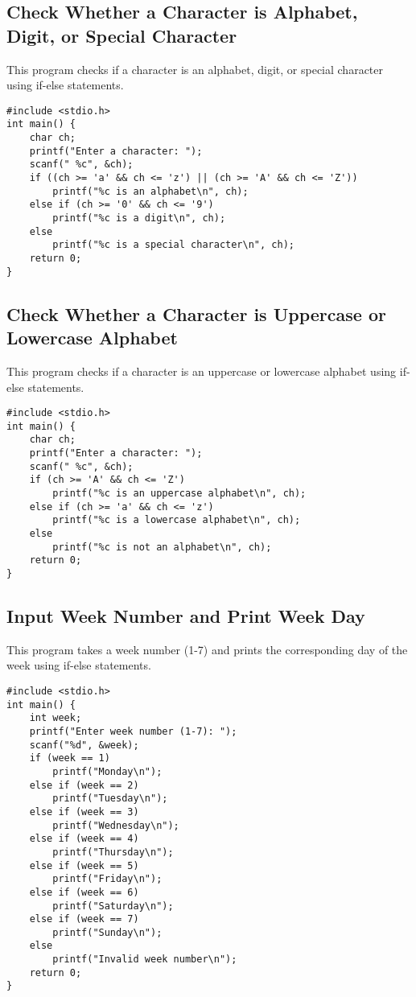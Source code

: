 \documentclass[a4paper,12pt]{article}
\begin{document}
\newpage

\subsection{Check Whether a Character is Alphabet, Digit, or Special Character}
This program checks if a character is an alphabet, digit, or special character using if-else statements.

\begin{lstlisting}[caption={Check Whether a Character is Alphabet, Digit, or Special Character}]
#include <stdio.h>
int main() {
    char ch;
    printf("Enter a character: ");
    scanf(" %c", &ch);
    if ((ch >= 'a' && ch <= 'z') || (ch >= 'A' && ch <= 'Z'))
        printf("%c is an alphabet\n", ch);
    else if (ch >= '0' && ch <= '9')
        printf("%c is a digit\n", ch);
    else
        printf("%c is a special character\n", ch);
    return 0;
}
\end{lstlisting}

\newpage

\subsection{Check Whether a Character is Uppercase or Lowercase Alphabet}
This program checks if a character is an uppercase or lowercase alphabet using if-else statements.

\begin{lstlisting}[caption={Check Whether a Character is Uppercase or Lowercase Alphabet}]
#include <stdio.h>
int main() {
    char ch;
    printf("Enter a character: ");
    scanf(" %c", &ch);
    if (ch >= 'A' && ch <= 'Z')
        printf("%c is an uppercase alphabet\n", ch);
    else if (ch >= 'a' && ch <= 'z')
        printf("%c is a lowercase alphabet\n", ch);
    else
        printf("%c is not an alphabet\n", ch);
    return 0;
}
\end{lstlisting}

\newpage

\subsection{Input Week Number and Print Week Day}
This program takes a week number (1-7) and prints the corresponding day of the week using if-else statements.

\begin{lstlisting}[caption={Input Week Number and Print Week Day}]
#include <stdio.h>
int main() {
    int week;
    printf("Enter week number (1-7): ");
    scanf("%d", &week);
    if (week == 1)
        printf("Monday\n");
    else if (week == 2)
        printf("Tuesday\n");
    else if (week == 3)
        printf("Wednesday\n");
    else if (week == 4)
        printf("Thursday\n");
    else if (week == 5)
        printf("Friday\n");
    else if (week == 6)
        printf("Saturday\n");
    else if (week == 7)
        printf("Sunday\n");
    else
        printf("Invalid week number\n");
    return 0;
}
\end{lstlisting}
\end{document}
